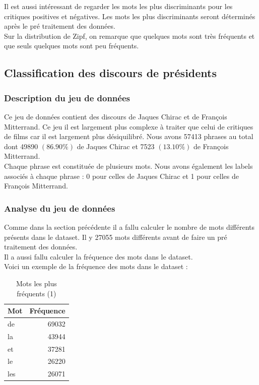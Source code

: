 \documentclass{article}
\begin{document}
Il est aussi intéressant de regarder les mots les plus discriminants pour les critiques positives et négatives. Les mots les plus discriminants seront déterminés après le pré traitement des données.\\
Sur la distribution de Zipf, on remarque que quelques mots sont très fréquents et que seuls quelques mots sont peu fréquents.\\


\subsection{Classification des discours de présidents}
\subsubsection{Description du jeu de données}

Ce jeu de données contient des discours de Jaques Chirac et de François Mitterrand. Ce jeu il est largement plus complexe à traiter que celui de critiques de films car il est largement plus désiquilibré. Nous avons 57413 phrases au total dont 49890 $(86.90\%)$ de Jaques Chirac et 7523 $(13.10\%)$ de François Mitterrand.\\
Chaque phrase est constituée de plusieurs mots. Nous avons également les labels associés à chaque phrase : 0 pour celles de Jaques Chirac et 1 pour celles de François Mitterrand.

\subsubsection{Analyse du jeu de données}
Comme dans la section précédente il a fallu calculer le nombre de mots différents présents dans le dataset. Il y 27055 mots différents avant de faire un pré traitement des données.\\
Il a aussi fallu calculer la fréquence des mots dans le dataset.\\
Voici un exemple de la fréquence des mots dans le dataset :

        \begin{table}[h]
        \centering
        \begin{tabular}{lr}
        \toprule
        Mot & Fréquence \\
        \midrule
        de & 69032 \\
        la & 43944 \\
        et & 37281 \\
        le & 26220 \\
        les & 26071 \\
        \bottomrule
        \end{tabular}
        \caption{Mots les plus fréquents (1)}
        \end{table}
\end{document}
